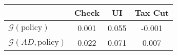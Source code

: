 \begin{tabular}{@{}lccc@{}} 
\toprule 
                          & Check      & UI    & Tax Cut    \\  \midrule 
$\mathcal{G}(\text{policy})$ & 0.001  & 0.055  & -0.001     \\ 
$\mathcal{G}(AD,\text{policy})$ & 0.022  & 0.071  & 0.007     \\ 
\end{tabular}  
